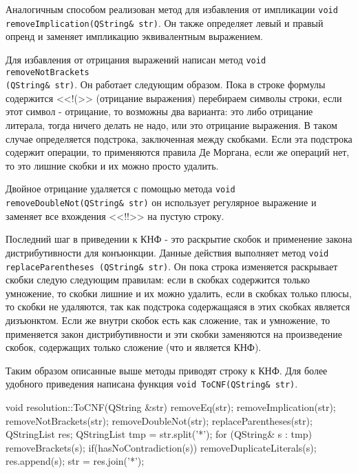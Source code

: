 \documentclass[12pt, a4paper]{article}
\begin{document}
	 \par Аналогичным способом реализован метод для избавления от импликации \texttt{void \\ removeImplication(QString\& str)}. Он также определяет левый и правый опренд и заменяет импликацию эквивалентным выражением.
	 \par Для избавления от отрицания выражений написан метод \texttt{void removeNotBrackets \\(QString\& str)}. Он работает следующим образом. Пока в строке формулы содержится <<!(>> (отрицание выражения) перебираем символы строки, если этот символ - отрицание, то возможны два варианта: это либо отрицание литерала, тогда ничего делать не надо, или это отрицание выражения. В таком случае определяется подстрока, заключенная между скобками. Если эта подстрока содержит операции, то применяются правила Де Моргана, если же операций нет, то это лишние скобки и их можно просто удалить.
	 \par Двойное отрицание удаляется с помощью метода \texttt{void removeDoubleNot(QString\& str)} он использует регулярное выражение и заменяет все вхождения <<!!>> на пустую строку.
	 \par Последний шаг в приведении к КНФ - это раскрытие скобок и применение закона дистрибутивности для конъюнкции. Данные действия выполняет метод \texttt{void \\replaceParentheses (QString\& str)}. Он пока строка изменяется раскрывает скобки следую следующим правилам: если в скобках содержится только умножение, то скобки лишние и их можно удалить, если в скобках только плюсы, то скобки не удаляются, так как подстрока содержащаяся в этих скобках является дизъюнктом. Если же внутри скобок есть как сложение, так и умножение, то применяется закон дистрибутивности и эти скобки заменяются на произведение скобок, содержащих только сложение (что и является КНФ).
	 \par Таким образом описанные выше методы приводят строку к КНФ. Для более удобного приведения написана функция \texttt{void ToCNF(QString\& str)}. 
	 \begin{cppcode}[caption = Метод void ToCNF(QString\& str).]
	 	void resolution::ToCNF(QString &str)
	 	{
	 		removeEq(str);
	 		removeImplication(str);
	 		removeNotBrackets(str);
	 		removeDoubleNot(str);
	 		replaceParentheses(str);
	 		QStringList res;
	 		QStringList tmp = str.split('*');
	 		for (QString& s : tmp) {
	 			removeBrackets(s);
	 			if(hasNoContradiction(s)){
	 				removeDuplicateLiterals(s);
	 				res.append(s);
	 			}
	 		}
	 		str = res.join('*');
	 	}
	 \end{cppcode}
\end{document}
